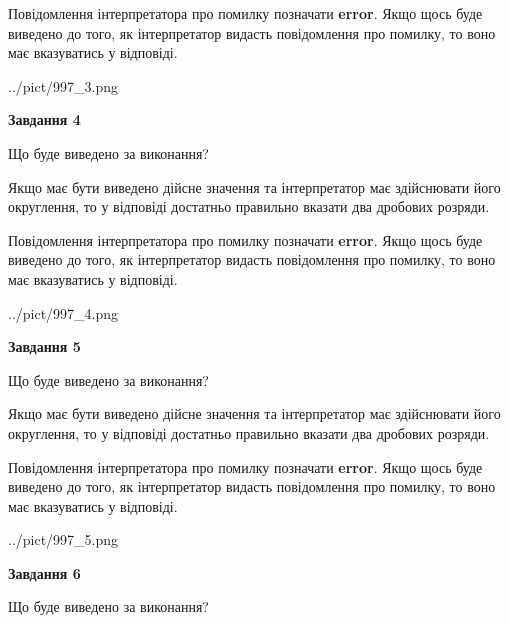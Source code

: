 \documentclass[12pt, ukrainian]{article}
\begin{document}
{\begin {Large}
Повідомлення інтерпретатора про помилку позначати \textbf{error}.
Якщо щось буде виведено до того, як інтерпретатор видасть повідомлення про помилку, 
то воно має вказуватись у відповіді. \par

\begin{center}
	{../pict/997_3.png}
\end{center}
\newpage

{\begin {center}\textbf{Завдання 4}\end {center}}\par
Що буде виведено за виконання? \par

Якщо має бути виведено дійсне значення та інтерпретатор має здійснювати його округлення, 
то у відповіді достатньо правильно вказати два дробових розряди.

Повідомлення інтерпретатора про помилку позначати \textbf{error}.
Якщо щось буде виведено до того, як інтерпретатор видасть повідомлення про помилку, 
то воно має вказуватись у відповіді. \par

\begin{center}
	{../pict/997_4.png}
\end{center}
\newpage

{\begin {center}\textbf{Завдання 5}\end {center}}\par
Що буде виведено за виконання? \par

Якщо має бути виведено дійсне значення та інтерпретатор має здійснювати його округлення, 
то у відповіді достатньо правильно вказати два дробових розряди.

Повідомлення інтерпретатора про помилку позначати \textbf{error}.
Якщо щось буде виведено до того, як інтерпретатор видасть повідомлення про помилку, 
то воно має вказуватись у відповіді. \par

\begin{center}
	{../pict/997_5.png}
\end{center}
\newpage

{\begin {center}\textbf{Завдання 6}\end {center}}\par
Що буде виведено за виконання? \par


\end{Large}}
\end{document}
